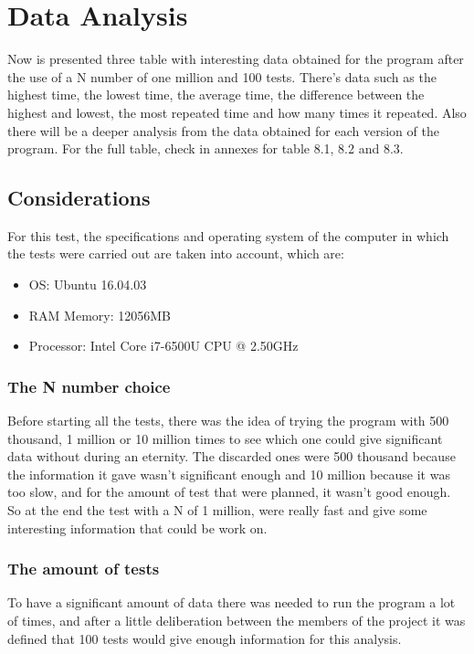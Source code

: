 \documentclass[legalpaper,12pt]{article}
\begin{document}

\section{Data Analysis}
\justifying
Now is presented three table with interesting data obtained for the program after the use of a N number of one million and 100 tests. There's data such as the highest time, the lowest time, the average time, the difference between the highest and lowest, the most repeated time and how many times it repeated. Also there will be a deeper analysis from the data obtained for each version of the program. For the full table, check in annexes for table 8.1, 8.2 and 8.3. 

\subsection{Considerations}
    \justifying
    For this test, the specifications and operating system of the computer in which the tests were carried out are taken into account, which are:
    
    \begin{itemize}
        \item OS:   Ubuntu 16.04.03 
        \item RAM Memory:   12056MB
        \item Processor:    Intel Core i7-6500U CPU @ 2.50GHz 
    \end{itemize}
    
    \subsubsection{The N number choice}
        \justifying
        Before starting all the tests, there was the idea of trying the program with 500 thousand, 1 million or 10 million times to see which one could give significant data without during an eternity. The discarded ones were 500 thousand because the information it gave wasn't significant enough and 10 million because it was too slow, and for the amount of test that were planned, it wasn't good enough. So at the end the test with a N of 1 million, were really fast and give some interesting information that could be work on.
    \subsubsection{The amount of tests}
        \justifying
        To have a significant amount of data there was needed to run the program a lot of times, and after a little deliberation between the members of the project it was defined that 100 tests would give enough information for this analysis.
\newpage
\end{document}
